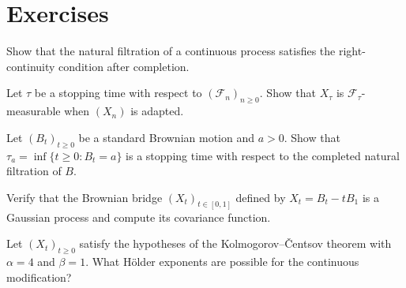 \section{Exercises}

\begin{exercise}
Show that the natural filtration of a continuous process satisfies the
right-continuity condition after completion.
\end{exercise}

\begin{exercise}
Let $\tau$ be a stopping time with respect to $(\mathcal{F}_n)_{n \geq 0}$.
Show that $X_{\tau}$ is $\mathcal{F}_{\tau}$-measurable when $(X_n)$ is adapted.
\end{exercise}

\begin{exercise}
Let $(B_t)_{t \geq 0}$ be a standard Brownian motion and $a > 0$. Show that
$\tau_a = \inf\{t \geq 0 : B_t = a\}$ is a stopping time with respect to the
completed natural filtration of $B$.
\end{exercise}

\begin{exercise}
Verify that the Brownian bridge $(X_t)_{t \in [0,1]}$ defined by
$X_t = B_t - tB_1$ is a Gaussian process and compute its covariance function.
\end{exercise}

\begin{exercise}
Let $(X_t)_{t \geq 0}$ satisfy the hypotheses of the Kolmogorov--\v{C}entsov
theorem with $\alpha = 4$ and $\beta = 1$. What H\"older exponents are possible
for the continuous modification?
\end{exercise}
